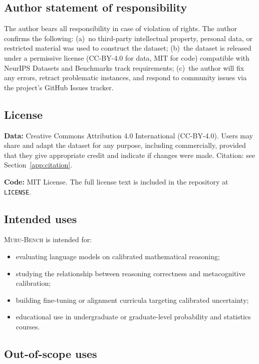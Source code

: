 \documentclass{article}
\newcommand{\muru}{\textsc{Muru-Bench}}
\begin{document}
\subsection*{Author statement of responsibility}

The author bears all responsibility in case of violation of rights. The author confirms the following:
(a)~no third-party intellectual property, personal data, or restricted material was used to construct the dataset;
(b)~the dataset is released under a permissive license (CC-BY-4.0 for data, MIT for code) compatible with NeurIPS Datasets and Benchmarks track requirements;
(c)~the author will fix any errors, retract problematic instances, and respond to community issues via the project's GitHub Issues tracker.

\subsection*{License}

\textbf{Data:} Creative Commons Attribution 4.0 International (CC-BY-4.0). Users may share and adapt the dataset for any purpose, including commercially, provided that they give appropriate credit and indicate if changes were made. Citation: see Section~\ref{app:citation}.

\textbf{Code:} MIT License. The full license text is included in the repository at \texttt{LICENSE}.

\subsection*{Intended uses}

\muru{} is intended for:
\begin{itemize}[leftmargin=*,itemsep=2pt]
    \item evaluating language models on calibrated mathematical reasoning;
    \item studying the relationship between reasoning correctness and metacognitive calibration;
    \item building fine-tuning or alignment curricula targeting calibrated uncertainty;
    \item educational use in undergraduate or graduate-level probability and statistics courses.
\end{itemize}

\subsection*{Out-of-scope uses}
\end{document}
